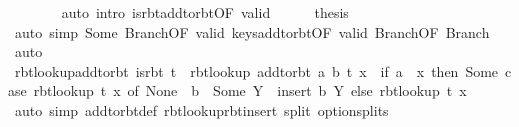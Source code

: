 \begin{isabellebody}
\ \ \ \ \ \ \isamarkupfalse%
\ {\isacharparenleft}{\kern0pt}auto\ intro{\isacharcolon}{\kern0pt}\ is{\isacharunderscore}{\kern0pt}rbt{\isacharunderscore}{\kern0pt}add{\isacharunderscore}{\kern0pt}to{\isacharunderscore}{\kern0pt}rbt{\isacharbrackleft}{\kern0pt}OF\ valid{\isacharbrackright}{\kern0pt}{\isacharparenright}{\kern0pt}\isanewline
\ \ \ \ \isamarkupfalse%
\ {\isacharquery}{\kern0pt}thesis\isanewline
\ \ \ \ \ \ \isamarkupfalse%
\ {\isacharparenleft}{\kern0pt}auto\ simp{\isacharcolon}{\kern0pt}\ Some\ Branch{\isacharparenleft}{\kern0pt}{}{\isacharparenright}{\kern0pt}{\isacharbrackleft}{\kern0pt}OF\ valid{\isacharprime}{\kern0pt}{\isacharbrackright}{\kern0pt}\ keys{\isacharunderscore}{\kern0pt}add{\isacharunderscore}{\kern0pt}to{\isacharunderscore}{\kern0pt}rbt{\isacharbrackleft}{\kern0pt}OF\ valid{\isacharbrackright}{\kern0pt}\ Branch{\isacharparenleft}{\kern0pt}{}{\isacharparenright}{\kern0pt}{\isacharbrackleft}{\kern0pt}OF\ Branch{\isacharparenleft}{\kern0pt}{}{\isacharparenright}{\kern0pt}{\isacharbrackright}{\kern0pt}{\isacharparenright}{\kern0pt}\isanewline
\ \ \isamarkupfalse%
\isanewline
{}\isamarkupfalse%
\ auto%
\endisatagproof
{\isafoldproof}%
%
\isadelimproof
\isanewline
%
\endisadelimproof
\isanewline
{}\isamarkupfalse%
\ rbt{\isacharunderscore}{\kern0pt}lookup{\isacharunderscore}{\kern0pt}add{\isacharunderscore}{\kern0pt}to{\isacharunderscore}{\kern0pt}rbt{\isacharcolon}{\kern0pt}\ {\isachardoublequoteopen}is{\isacharunderscore}{\kern0pt}rbt\ t\ {\isasymLongrightarrow}\ rbt{\isacharunderscore}{\kern0pt}lookup\ {\isacharparenleft}{\kern0pt}add{\isacharunderscore}{\kern0pt}to{\isacharunderscore}{\kern0pt}rbt\ {\isacharparenleft}{\kern0pt}a{\isacharcomma}{\kern0pt}\ b{\isacharparenright}{\kern0pt}\ t{\isacharparenright}{\kern0pt}\ x\ {\isacharequal}{\kern0pt}\ {\isacharparenleft}{\kern0pt}if\ a\ {\isacharequal}{\kern0pt}\ x\ then\ Some\ {\isacharparenleft}{\kern0pt}case\ rbt{\isacharunderscore}{\kern0pt}lookup\ t\ x\ of\ None\ {\isasymRightarrow}\ {\isacharbraceleft}{\kern0pt}b{\isacharbraceright}{\kern0pt}\ {\isacharbar}{\kern0pt}\ Some\ Y\ {\isasymRightarrow}\ insert\ b\ Y{\isacharparenright}{\kern0pt}\ else\ rbt{\isacharunderscore}{\kern0pt}lookup\ t\ x{\isacharparenright}{\kern0pt}{\isachardoublequoteclose}\isanewline
%
\isadelimproof
\ \ %
\endisadelimproof
%
\isatagproof
{}\isamarkupfalse%
\ {\isacharparenleft}{\kern0pt}auto\ simp{\isacharcolon}{\kern0pt}\ add{\isacharunderscore}{\kern0pt}to{\isacharunderscore}{\kern0pt}rbt{\isacharunderscore}{\kern0pt}def\ rbt{\isacharunderscore}{\kern0pt}lookup{\isacharunderscore}{\kern0pt}rbt{\isacharunderscore}{\kern0pt}insert\ split{\isacharcolon}{\kern0pt}\ option{\isachardot}{\kern0pt}splits{\isacharparenright}{\kern0pt}%

\end{isabellebody}
